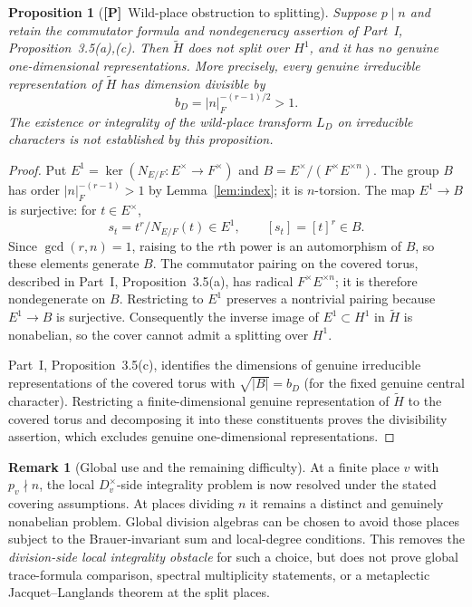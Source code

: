 \documentclass[11pt]{article}
\newcommand{\tH}{\widetilde H}
\newcommand{\Ptag}{\textnormal{\textbf{[P]}}}
\theoremstyle{plain}
\newtheorem{proposition}[theorem]{Proposition}
\theoremstyle{definition}
\newtheorem{remark}[theorem]{Remark}
\begin{document}
\begin{proposition}[\Ptag\ Wild-place obstruction to splitting]\label{prop:wild-obstruction}
Suppose $p\mid n$ and retain the commutator formula and
nondegeneracy assertion of Part~I, Proposition~3.5(a),(c).
Then $\tH$ does not split over $H^1$, and it has no genuine
one-dimensional representations. More precisely, every genuine irreducible
representation of $\tH$ has dimension divisible by
\[
 b_D=|n|_F^{-(r-1)/2}>1.
\]
The existence or integrality of the wild-place transform $L_D$
on irreducible characters is not established by this proposition.
\end{proposition}
\begin{proof}
Put $E^1=\ker(N_{E/F}:E^\times\to F^\times)$ and
$B=E^\times/(F^\times E^{\times n})$. The group $B$ has
order $|n|_F^{-(r-1)}>1$ by Lemma~\ref{lem:index}; it is
$n$-torsion. The map $E^1\to B$ is surjective: for $t\in E^\times$,
\[
 s_t=t^r/N_{E/F}(t)\in E^1,
\qquad [s_t]=[t]^r\in B.
\]
Since $\gcd(r,n)=1$, raising to the $r$th power is an
automorphism of $B$, so these elements generate $B$.
The commutator pairing on the covered torus, described in
Part~I, Proposition~3.5(a), has radical
$F^\times E^{\times n}$; it is therefore nondegenerate on
$B$. Restricting to $E^1$ preserves a nontrivial pairing
because $E^1\to B$ is surjective. Consequently the
inverse image of $E^1\subset H^1$ in $\tH$ is nonabelian,
so the cover cannot admit a splitting over $H^1$.

Part~I, Proposition~3.5(c), identifies the dimensions of
genuine irreducible representations of the covered torus
with $\sqrt{|B|}=b_D$ (for the fixed genuine central
character). Restricting a finite-dimensional genuine
representation of $\tH$ to the covered torus and decomposing
it into these constituents proves the divisibility assertion,
which excludes genuine one-dimensional representations.
\end{proof}

\begin{remark}[Global use and the remaining difficulty]\label{rem:global-tame}
At a finite place $v$ with $p_v\nmid n$, the local
$D_v^\times$-side integrality problem is now resolved under
the stated covering assumptions. At places dividing $n$
it remains a distinct and genuinely nonabelian problem.
Global division algebras can be chosen to avoid those places
subject to the Brauer-invariant sum and local-degree
conditions. This removes the \emph{division-side local
integrality obstacle} for such a choice, but does not prove
global trace-formula comparison, spectral multiplicity
statements, or a metaplectic Jacquet--Langlands theorem
at the split places.
\end{remark}
\end{document}
